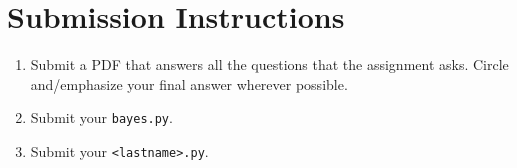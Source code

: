 \documentclass{homework}
\begin{document}
\section*{Submission Instructions}
\begin{enumerate}
  \item Submit a PDF that answers all the questions that the
        assignment asks. Circle and/emphasize your final answer wherever
        possible.
  \item Submit your \texttt{bayes.py}.
  \item Submit your \texttt{<lastname>.py}.
\end{enumerate}
\end{document}
